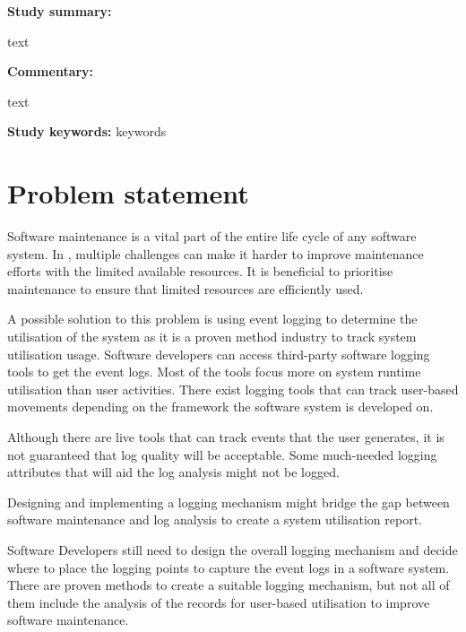 \clearpage

\begin{tcolorbox}[colback=gray!5!white, colframe=deepblue!80!black, title=Test\cite{Ogheneovo2014}]
	\begin{minipage}[t]{0.25\textwidth}
		\textbf{Study summary:}
	\end{minipage}
	\hfill
	\begin{minipage}[t]{0.65\textwidth}
		text
	\end{minipage}

	\vspace{0.75em} 

	\begin{minipage}[t]{0.25\textwidth}
		\textbf{Commentary:}
	\end{minipage}
	\hfill
	\begin{minipage}[t]{0.65\textwidth}
		text
	\end{minipage}
	\tcblower
	\textbf{Study keywords:} keywords
\end{tcolorbox}



\section{Problem statement}\label{sec:ch1_problemStatement}
Software maintenance is a vital part of the entire life cycle of any software system. In , multiple challenges can make it harder to improve maintenance efforts with the limited available resources. It is beneficial to prioritise maintenance to ensure that limited resources are efficiently used. \par A possible solution to this problem is using event logging to determine the utilisation of the system as it is a proven method industry to track system utilisation usage. Software developers can access third-party software logging tools to get the event logs. Most of the tools focus more on system runtime utilisation than user activities. There exist logging tools that can track user-based movements depending on the framework the software system is developed on.\par Although there are live tools that can track events that the user generates, it is not guaranteed that log quality will be acceptable. Some much-needed logging attributes that will aid the log analysis might not be logged.\par Designing and implementing a logging mechanism might bridge the gap between software maintenance and log analysis to create a system utilisation report.\par Software Developers still need to design the overall logging mechanism and decide where to place the logging points to capture the event logs in a software system. There are proven methods to create a suitable logging mechanism, but not all of them include the analysis of the records for user-based utilisation to improve software maintenance.

